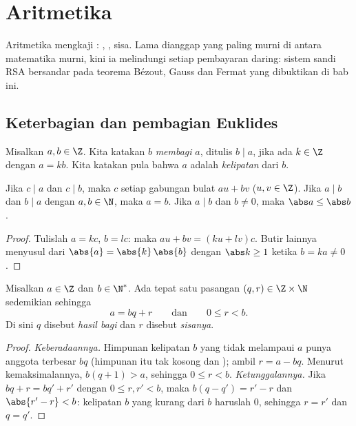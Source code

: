 \chapter{Aritmetika}\label{ch:g12:arith}

Aritmetika mengkaji : , , sisa.
Lama dianggap yang paling murni di antara matematika murni, kini ia melindungi
setiap pembayaran daring: sistem sandi RSA bersandar pada teorema Bézout, Gauss
dan Fermat yang dibuktikan di bab ini.

\section{Keterbagian dan pembagian Euklides}

\begin{definition}[Keterbagian]\label{def:g12:arith:divides}
Misalkan $a, b \in \Z$. Kita katakan $b$ \emph{membagi} $a$,
ditulis $b \mid a$, jika ada $k \in \Z$ dengan $a = kb$. Kita katakan pula bahwa
$a$ adalah \emph{kelipatan} dari $b$.
\end{definition}

\begin{proposition}\label{prop:g12:arith:divprops}
Jika $c \mid a$ dan $c \mid b$, maka $c$  setiap gabungan bulat
$au + bv$ ($u, v \in \Z$). Jika $a \mid b$ dan $b \mid a$ dengan
$a,b \in \N$, maka $a = b$. Jika $a \mid b$ dan $b \neq 0$, maka $\abs a \leq \abs b$.
\end{proposition}

\begin{proof}
Tulislah $a = kc$, $b = lc$: maka $au + bv = (ku + lv)c$. Butir lainnya
menyusul dari $\abs{a} = \abs{k}\,\abs{b}$ dengan $\abs k \geq 1$ ketika
$b = ka \neq 0$.
\end{proof}

\begin{theorem}\label{thm:g12:arith:euclid}
Misalkan $a \in \Z$ dan $b \in \N^*$. Ada tepat satu pasangan
$(q, r) \in \Z \times \N$ sedemikian sehingga
\[
a = bq + r \qquad\text{dan}\qquad 0 \leq r < b .
\]
Di sini $q$ disebut \emph{hasil bagi} dan $r$ disebut \emph{sisanya}.
\end{theorem}

\begin{proof}
\emph{Keberadaannya.} Himpunan kelipatan $b$ yang tidak melampaui $a$ punya
anggota terbesar $bq$ (himpunan itu tak kosong dan ); ambil $r = a - bq$.
Menurut kemaksimalannya, $b(q+1) > a$, sehingga $0 \leq r < b$.
\emph{Ketunggalannya.} Jika $bq + r = bq' + r'$ dengan $0 \leq r, r' < b$, maka
$b(q - q') = r' - r$ dan $\abs{r' - r} < b$: kelipatan $b$ yang 
kurang dari $b$ haruslah $0$, sehingga $r = r'$ dan $q = q'$.
\end{proof}

